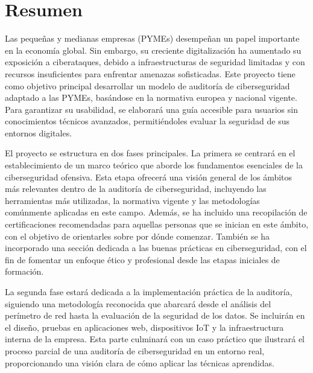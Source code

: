 \documentclass[a4paper, 10pt]{article}
\begin{document}

\section*{Resumen}
\thispagestyle{empty}
Las pequeñas y medianas empresas (PYMEs) desempeñan un papel importante en la economía global. Sin embargo, su creciente
digitalización ha aumentado su exposición a ciberataques, debido a infraestructuras de seguridad limitadas y con recursos insuficientes para enfrentar amenazas sofisticadas. 
Este proyecto tiene como objetivo principal desarrollar un modelo de auditoría de ciberseguridad adaptado a las PYMEs, basándose en la normativa europea y nacional vigente. Para garantizar su usabilidad, se elaborará una guía accesible para usuarios sin conocimientos técnicos avanzados, permitiéndoles evaluar la seguridad de sus entornos digitales.
\par\vspace{0.5cm}

El proyecto se estructura en dos fases principales. La primera se centrará en el establecimiento de un marco teórico que aborde los fundamentos esenciales de la ciberseguridad ofensiva. 
 Esta etapa ofrecerá una visión general de los ámbitos más relevantes dentro de la auditoría de ciberseguridad, incluyendo las herramientas más utilizadas, la normativa vigente y las metodologías comúnmente aplicadas en este campo. Además, se ha incluido una recopilación de certificaciones recomendadas para aquellas personas que se inician en este ámbito, con el objetivo de orientarles sobre por dónde comenzar. También se ha incorporado una sección dedicada a las buenas prácticas en ciberseguridad, con el fin de fomentar un enfoque ético y profesional desde las etapas iniciales de formación.\par\vspace{0.5cm}

La segunda fase estará dedicada a la implementación práctica de la auditoría, siguiendo una 
metodología reconocida que abarcará desde el análisis del perímetro de red hasta la evaluación de la seguridad de los datos. 
Se incluirán en el diseño, pruebas en aplicaciones web, dispositivos IoT y la infraestructura interna de la empresa. 
Esta parte culminará con un caso práctico que ilustrará el proceso parcial de una auditoría de ciberseguridad en un entorno real, proporcionando una visión clara de cómo aplicar las técnicas aprendidas.
\par\vspace{0.5cm}
\end{document}
